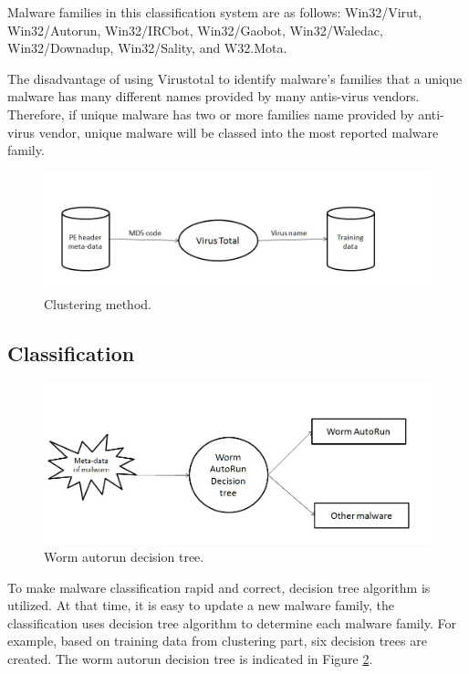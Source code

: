 Malware families in this classification system are as follows: Win32/Virut, Win32/Autorun, Win32/IRCbot, Win32/Gaobot, Win32/Waledac, Win32/Downadup, Win32/Sality, and W32.Mota. 

The disadvantage of using Virustotal to identify malware's families that a unique malware has many different names provided by many antis-virus vendors. Therefore, if unique malware has two or more families name provided by anti-virus vendor, unique malware will be classed into the most reported malware family.
 
\begin{figure}[h!]
\centering
\includegraphics[width=1\textwidth]{graph/clustering.jpg}
\caption{Clustering method.}
\label{fig:clustering}
\end{figure}

\subsection{Classification}
\begin{figure}[h!]
\centering
\includegraphics[width=1\textwidth]{graph/classificationdecision.jpg}
\caption{Worm autorun decision tree.}
\label{fig:classificationdecision}
\end{figure}

To make malware classification rapid and correct, decision tree algorithm is utilized. At that time, it is easy to update a new malware family, the classification uses decision tree algorithm to determine each malware family. For example, based on training data from clustering part, six decision trees are created. The worm autorun decision tree is indicated in Figure \ref{fig:classificationdecision}.

